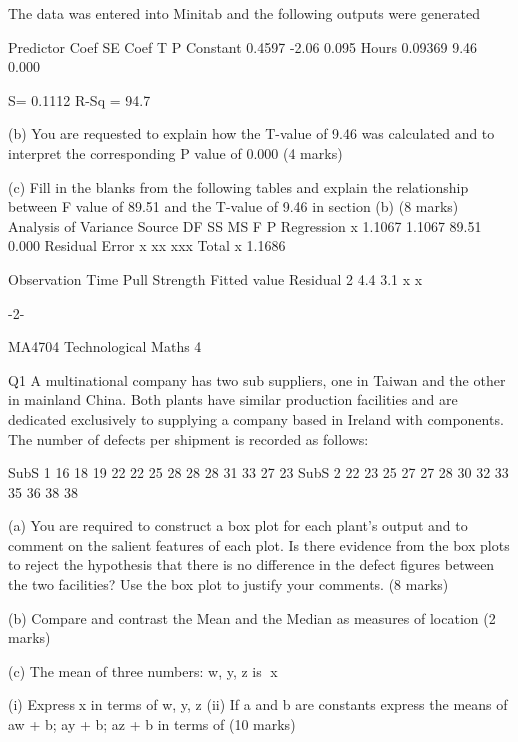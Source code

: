 \begin{itemize}
The data was entered into Minitab and the following outputs were generated

Predictor	Coef		SE Coef	T		P
Constant			0.4597		-2.06		0.095
Hours				0.09369	 9.46		0.000

S= 0.1112	R-Sq = 94.7%


(b) 	You are requested to explain how the T-value of 9.46 was calculated and to 
interpret the corresponding P value of 0.000
										(4 marks)

											

(c)	Fill in the blanks from the following tables and explain the relationship between F value of 89.51 and the T-value of 9.46 in section (b)
										(8 marks)
Analysis of Variance
Source			DF		SS		MS		F		P
Regression		x		1.1067		1.1067		89.51		0.000
Residual Error		x		xx		xxx		
Total			x		1.1686



Observation		Time		Pull Strength		Fitted value	Residual
2			4.4		3.1			x		x


                                                                         -2-

MA4704 Technological Maths 4 

Q1
A multinational company has two sub suppliers, one in Taiwan and the other in mainland China.  Both plants have similar production facilities and are dedicated exclusively to supplying a company based in Ireland with components.
The number of defects per shipment is recorded as follows:

SubS 1	16	18	19	22	22	25	28	28	28	31	33	27	23
SubS 2	22	23	25	27	27	28	30	32	33	35	36	38	38

(a)	You are required to construct a box plot for each plant’s output and to comment on the salient features of each plot.  Is there evidence from the box plots to reject the hypothesis that there is no difference in the defect figures between the two facilities?  Use the box plot to justify your comments.
											(8 marks)

(b)	Compare and contrast the Mean and the Median as measures of location
											(2 marks)

	(c)	The mean of three numbers: w, y, z is x

		(i) Expressx in terms of w, y, z
		(ii)  If a and b are constants express the means of 
aw + b;   ay + b;   az + b
in terms of  
									(10 marks)


\end{itemize}
